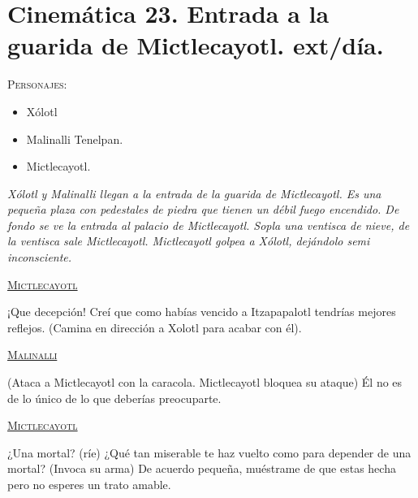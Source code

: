 \section{Cinemática 23. Entrada a la guarida de Mictlecayotl. ext/día.}  \label{Cin:Cinematica23}
 \textsc{Personajes}:
 \begin{itemize}
 \item Xólotl
 \item Malinalli Tenelpan.
 \item Mictlecayotl.
 \end{itemize}
\textit{Xólotl y Malinalli llegan a la entrada de la guarida de Mictlecayotl. Es una pequeña plaza con pedestales de piedra que tienen un débil fuego encendido. De fondo se ve la entrada al palacio de Mictlecayotl. Sopla una ventisca de nieve, de la ventisca sale Mictlecayotl. Mictlecayotl golpea a Xólotl, dejándolo semi inconsciente.}
\begin{center}
\textsc{\underline{Mictlecayotl}}
\\
\par
¡Que decepción! Creí que como habías vencido a Itzapapalotl tendrías mejores reflejos. (Camina en dirección a Xolotl para acabar con él).
\\
\par
\textsc{\underline{Malinalli}}
\\
\par
(Ataca a Mictlecayotl con la caracola. Mictlecayotl bloquea su ataque) Él no es de lo único de lo que deberías preocuparte.
\\
\par
\textsc{\underline{Mictlecayotl}}
\\
\par
¿Una mortal? (ríe) ¿Qué tan miserable te haz vuelto como para depender de una mortal? (Invoca su arma) De acuerdo pequeña, muéstrame de que estas hecha pero no esperes un trato amable.
\end{center}